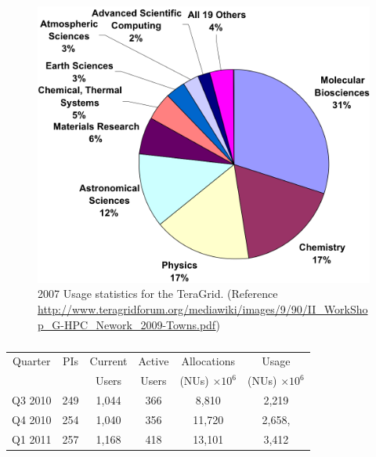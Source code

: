 \documentclass{sig-alternate}
\begin{document}


\begin{figure}
 \centering
\includegraphics[scale=0.40]{figures/teragrid-discipline07}
\caption{\small 2007 Usage statistics for the TeraGrid.  (Reference
  \url{http://www.teragridforum.org/mediawiki/images/9/90/II_WorkShop_G-HPC_Nework_2009-Towns.pdf})}
  \label{tg2007}
\end{figure}


\begin{table}
 \small
\begin{tabular}{|c|c|c|c|c|c|} 
  \hline  Quarter & PIs & Current & Active & Allocations  & Usage\\
  & & Users  &  Users & (NUs) $\times 10^6$& (NUs) $\times 10^6$ \\ \hline

  Q3 2010 & 249 & 1,044 & 366 & 8,810   & 2,219  \\ \hline
  Q4 2010 & 254 & 1,040 & 356 & 11,720  & 2,658, \\ \hline
  Q1 2011 & 257 & 1,168 & 418 & 13,101  & 3,412\\ \hline 
\end{tabular} 
\caption{}
 \label{} 
\end{table}
\end{document}
